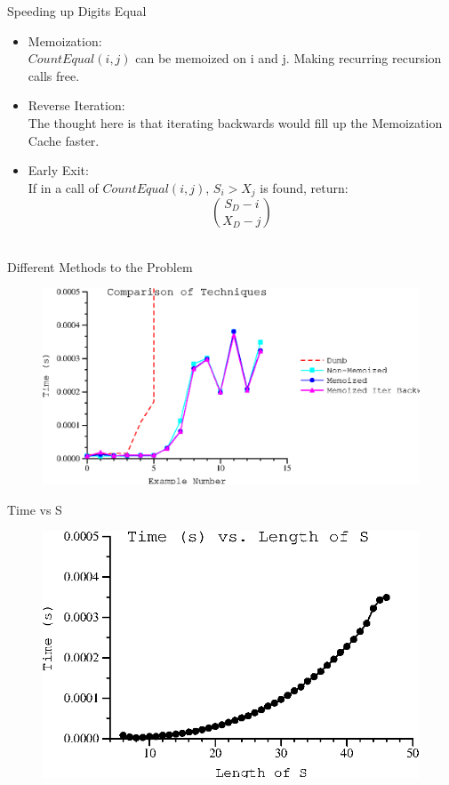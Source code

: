 \documentclass[10pt]{beamer}
\begin{document}
\begin{frame}{Speeding up Digits Equal}
  \begin{itemize}
    \item Memoization: \\
      $CountEqual(i, j)$ can be memoized on i and j.
      Making recurring recursion calls free.
    \item Reverse Iteration: \\
      The thought here is that iterating backwards would fill up the Memoization Cache faster.
    \item Early Exit: \\
      If in a call of $CountEqual(i, j)$, $S_{i} > X_{j}$ is found, return:\\
      \begin{equation*}
        \binom{S_{D} - i}{X_{D} - j}
      \end{equation*}\\
  \end{itemize}
\end{frame}


\begin{frame}{Different Methods to the Problem}
  \begin{figure}[ht!]
    \centering
    \includegraphics[width=1.0\textwidth]{../figures/comparison.ps}
  \end{figure}
\end{frame}

\begin{frame}{Time vs S}
  \begin{figure}[ht!]
    \centering
    \includegraphics[width=1.0\textwidth]{../figures/vary_s.ps}
  \end{figure}
\end{frame}
\end{document}
